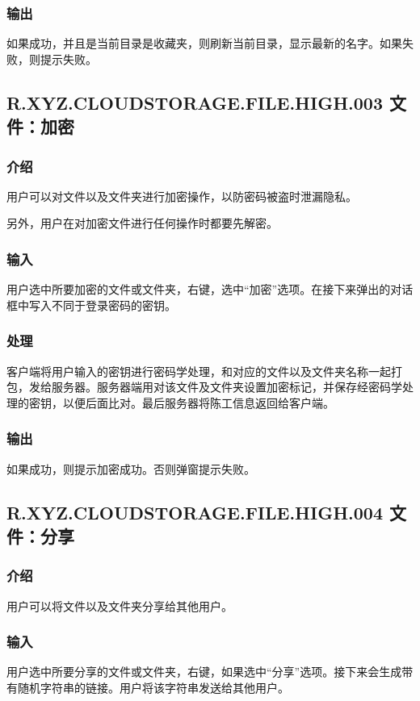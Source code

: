 \subsubsection{输出}
如果成功，并且是当前目录是收藏夹，则刷新当前目录，显示最新的名字。如果失败，则提示失败。



\subsection{R.XYZ.CLOUDSTORAGE.FILE.HIGH.003 文件：加密}

\subsubsection{介绍}
用户可以对文件以及文件夹进行加密操作，以防密码被盗时泄漏隐私。 

另外，用户在对加密文件进行任何操作时都要先解密。

\subsubsection{输入} 
用户选中所要加密的文件或文件夹，右键，选中“加密”选项。在接下来弹出的对话框中写入不同于登录密码的密钥。

\subsubsection{处理} 
客户端将用户输入的密钥进行密码学处理，和对应的文件以及文件夹名称一起打包，发给服务器。服务器端用对该文件及文件夹设置加密标记，并保存经密码学处理的密钥，以便后面比对。最后服务器将陈工信息返回给客户端。

\subsubsection{输出} 
如果成功，则提示加密成功。否则弹窗提示失败。



\subsection{R.XYZ.CLOUDSTORAGE.FILE.HIGH.004 文件：分享}

\subsubsection{介绍}
用户可以将文件以及文件夹分享给其他用户。

\subsubsection{输入} 
用户选中所要分享的文件或文件夹，右键，如果选中“分享”选项。接下来会生成带有随机字符串的链接。用户将该字符串发送给其他用户。

